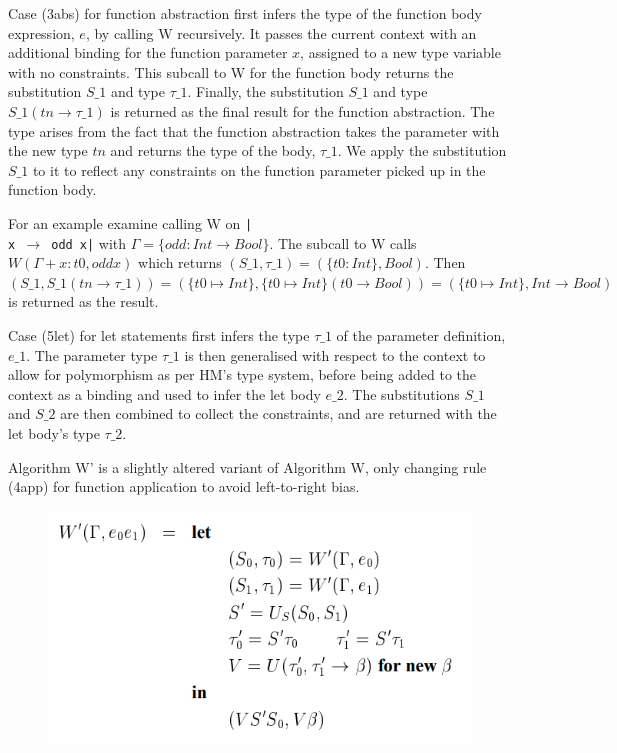 \documentclass[a4paper,fleqn,twoside,12pt]{report}
\begin{document}
Case (3abs) for function abstraction first infers the type of the function body expression, $e$, by calling W recursively. It passes the current context with an additional binding for the function parameter $x$, assigned to a new type variable with no constraints. This subcall to W for the function body returns the substitution $S\_1$ and type $\tau\_1$. Finally, the substitution $S\_1$ and type $S\_1(tn \rightarrow \tau\_1)$ is returned as the final result for the function abstraction. The type arises from the fact that the function abstraction takes the parameter with the new type $tn$ and returns the type of the body, $\tau\_1$. We apply the substitution $S\_1$ to it to reflect any constraints on the function parameter picked up in the function body.

For an example examine calling W on \texttt{|\\x $\rightarrow$ odd x|} with $\Gamma = \{ odd: Int \rightarrow Bool \}$. The subcall to W calls $W(\Gamma + x: t0, odd x)$ which returns $(S\_1, \tau\_1) = (\{ t0: Int \}, Bool)$. Then $(S\_1, S\_1(tn \rightarrow \tau\_1)) = (\{ t0 \mapsto Int \}, \{ t0 \mapsto Int \}(t0 \rightarrow Bool)) = (\{ t0 \mapsto Int \}, Int \rightarrow Bool)$ is returned as the result.

Case (5let) for let statements first infers the type $\tau\_1$ of the parameter definition, $e\_1$. The parameter type $\tau\_1$ is then generalised with respect to the context to allow for polymorphism as per HM’s type system, before being added to the context as a binding and used to infer the let body $e\_2$. The substitutions $S\_1$ and $S\_2$ are then combined to collect the constraints, and are returned with the let body’s type $\tau\_2$.

Algorithm W’ is a slightly altered variant of Algorithm W, only changing rule (4app) for function application to avoid left-to-right bias.

\begin{figure}[h!]
  \centering
  \includegraphics[width=0.782\linewidth]{images/image22.png}
\end{figure}
\end{document}
